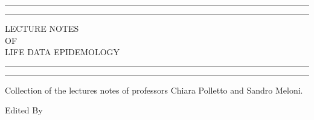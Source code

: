 \begin{titlepage} %

	\centering %
	
	\scshape %
	
	\vspace*{\baselineskip} %
	
	
	\rule{\textwidth}{1.6pt}\vspace*{-\baselineskip}\vspace*{2pt} %
	\rule{\textwidth}{0.4pt} %
	
	\vspace{0.75\baselineskip} %
	
	{\LARGE LECTURE NOTES\\ OF\\ LIFE DATA EPIDEMOLOGY \\} %
	
	\vspace{0.75\baselineskip} %
	
	\rule{\textwidth}{0.4pt}\vspace*{-\baselineskip}\vspace{3.2pt} %
	\rule{\textwidth}{1.6pt} %
	
	\vspace{2\baselineskip} %
	
	
	Collection of the lectures notes of professors Chiara Polletto and Sandro Meloni. %
	
	\vspace*{3\baselineskip} %
	
	
	Edited By
	
	\vspace{0.5\baselineskip} %
	

\end{titlepage}
